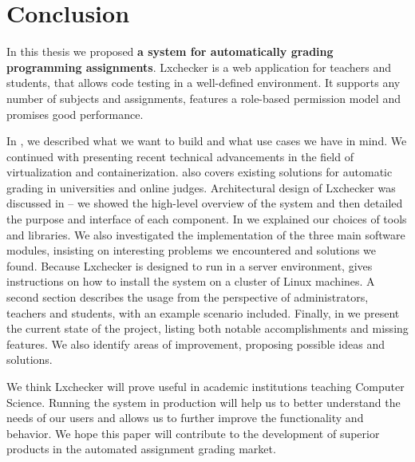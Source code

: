 \chapter{Conclusion}
\label{chapter:conclusion}

In this thesis we proposed \textbf{a system for automatically grading programming assignments}. Lxchecker is a web application for teachers and students, that allows code testing in a well-defined environment. It supports any number of subjects and assignments, features a role-based permission model and promises good performance.

In , we described what we want to build and what use cases we have in mind. We continued with presenting recent technical advancements in the field of virtualization and containerization.  also covers existing solutions for automatic grading in universities and online judges. Architectural design of Lxchecker was discussed in  -- we showed the high-level overview of the system and then detailed the purpose and interface of each component. In  we explained our choices of tools and libraries. We also investigated the implementation of the three main software modules, insisting on interesting problems we encountered and solutions we found. Because Lxchecker is designed to run in a server environment,  gives instructions on how to install the system on a cluster of Linux machines. A second section describes the usage from the perspective of administrators, teachers and students, with an example scenario included. Finally, in  we present the current state of the project, listing both notable accomplishments and missing features. We also identify areas of improvement, proposing possible ideas and solutions.

We think Lxchecker will prove useful in academic institutions teaching Computer Science. Running the system in production will help us to better understand the needs of our users and allows us to further improve the functionality and behavior. We hope this paper will contribute to the development of superior products in the automated assignment grading market.
